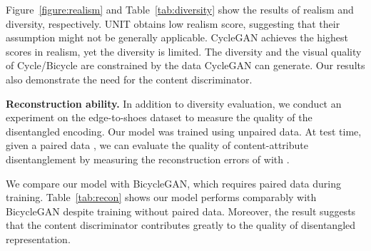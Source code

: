 \documentclass[runningheads]{llncs}
\newlength\paramargin
\newcommand{\Paragraph}[1]
{\vspace{2mm} \noindent \textbf{#1}}
\newcommand{\figref}[1]{Figure~\ref{figure:#1}}
\newcommand{\tabref}[1]{Table~\ref{tab:#1}}
\begin{document}
\figref{realism} and \tabref{diversity} show the results of realism and diversity, respectively.
UNIT obtains low realism score, suggesting that their assumption might not be generally applicable.
CycleGAN achieves the highest scores in realism, yet the diversity is limited.
The diversity and the visual quality of Cycle/Bicycle are constrained by the data CycleGAN can generate.
Our results also demonstrate the need for the content discriminator.




\vspace{\paramargin}
\Paragraph{Reconstruction ability.} 
In addition to diversity evaluation, we conduct an experiment on the edge-to-shoes dataset to measure the quality of the disentangled encoding.
Our model was trained using unpaired data.
At test time, given a paired data , we can evaluate the quality of content-attribute disentanglement by measuring the reconstruction errors of  with .

We compare our model with BicycleGAN, which requires paired data during training.
\tabref{recon} shows our model performs comparably with BicycleGAN despite training without paired data.
Moreover, the result suggests that the content discriminator contributes greatly to the quality of disentangled representation.
\vspace{-1mm}
\end{document}
